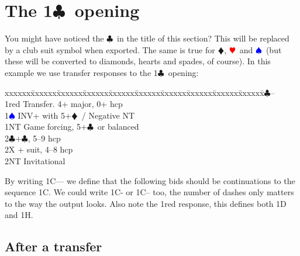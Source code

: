 \documentclass[a4paper]{article}
\newcommand{\BC}{\textcolor{OliveGreen}{$\clubsuit$}}
\newcommand{\BD}{\textcolor{RedOrange}{$\vardiamondsuit$}}
\newcommand{\BH}{\textcolor{Red}{$\varheartsuit${}}}
\newcommand{\BS}{\textcolor{Blue}{$\spadesuit${}}}
\newcommand{\pdfc}{\texorpdfstring{\BC{}}{C}}
\newenvironment{bidtable}
{\begin{tabbing}

xxxxxx\=xxxxxx\=xxxxxx\=xxxxxx\=xxxxxx\=xxxxxx\=xxxxxx\=xxxxxx\=xxxxxx\=xxxxxx\=\kill}
{\end{tabbing} }%
\begin{document}
\section{The 1\pdfc\ opening}

You might have noticed the \BC\ in the title of this section? This
will be replaced by a club suit symbol when exported. The same is
true for \BD , \BH\ and \BS\ (but these will be converted to diamonds,
hearts and spades, of course).
\bigbreak
In this example we use transfer responses to the 1\BC\ opening:
\bigbreak
\begin{bidtable}
1\BC--\+\\
1red \> Transfer. 4+ major, 0+ hcp\\
1\BS \> INV+ with 5+\BD\ / Negative NT\\
1NT \> Game forcing, 5+\BC\ or balanced\\
2\BC {}+\BC , 5--9 hcp\\
2X + suit, 4--8 hcp\\
2NT \> Invitational\-
\end{bidtable}
\bigbreak
By writing 1C--- we define that the following bids should be
continuations to the sequence 1C. We could write 1C- or 1C-- too,
the number of dashes only matters to the way the output looks. Also
note the 1red response, this defines both 1D and 1H.
\bigbreak
\subsection{After a transfer}
\end{document}
